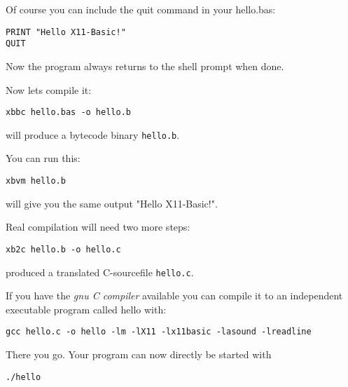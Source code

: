 Of course you can include the quit command in your hello.bas:
\begin{mdframed}[hidealllines=true,backgroundcolor=blue!20]
\begin{verbatim}
PRINT "Hello X11-Basic!"
QUIT
\end{verbatim}
\end{mdframed}
Now the program always returns to the shell prompt when done. 

Now lets compile it:
\begin{mdframed}[hidealllines=true,backgroundcolor=black!20]
\begin{verbatim}
xbbc hello.bas -o hello.b
\end{verbatim}
\end{mdframed}
will produce a bytecode binary \verb|hello.b|.

You can run this:
\begin{mdframed}[hidealllines=true,backgroundcolor=black!20]
\begin{verbatim}
xbvm hello.b 
\end{verbatim}
\end{mdframed}
will give you the same output "Hello X11-Basic!".

Real compilation will need two more steps:

\begin{mdframed}[hidealllines=true,backgroundcolor=black!20]
\begin{verbatim}
xb2c hello.b -o hello.c 
\end{verbatim}
\end{mdframed}

produced a translated C-sourcefile \verb|hello.c|.

If you have the {\normalfont \itshape gnu C compiler} available you can compile it to an 
independent executable program called hello with:

\begin{mdframed}[hidealllines=true,backgroundcolor=black!20]
\begin{verbatim}
gcc hello.c -o hello -lm -lX11 -lx11basic -lasound -lreadline
\end{verbatim}
\end{mdframed}

There you go. Your program can now directly be started with 
\begin{mdframed}[hidealllines=true,backgroundcolor=black!20]
\begin{verbatim}
./hello
\end{verbatim}
\end{mdframed}

